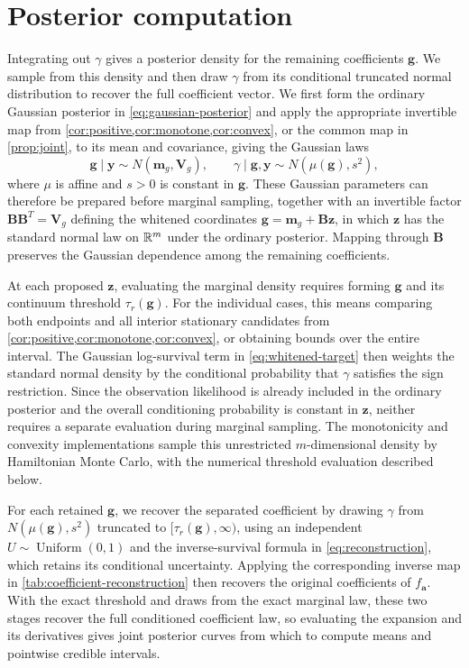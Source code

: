 \section{Posterior computation}\label{sec:computation}

Integrating out $\gamma$ gives a posterior density for the remaining
coefficients $\boldsymbol g$. We sample from this density and then draw
$\gamma$ from its conditional truncated normal distribution to recover
the full coefficient vector. We first form the ordinary
Gaussian posterior in \cref{eq:gaussian-posterior} and apply the
appropriate invertible map from
\cref{cor:positive,cor:monotone,cor:convex}, or the common map in
\cref{prop:joint}, to its mean and covariance,
giving the Gaussian laws
\[
 \boldsymbol g\mid\boldsymbol y\sim N(\boldsymbol m_g,\boldsymbol V_g),
 \qquad \gamma\mid\boldsymbol g,\boldsymbol y\sim N(\mu(\boldsymbol g),s^2),
\]
where $\mu$ is affine and $s>0$ is constant in $\boldsymbol g$.
These Gaussian parameters can therefore be prepared before marginal
sampling, together with an invertible factor
$\boldsymbol B\boldsymbol B^T=\boldsymbol V_g$ defining the whitened
coordinates $\boldsymbol g=\boldsymbol m_g+\boldsymbol B\boldsymbol z$,
in which $\boldsymbol z$ has the standard normal law on $\mathbb R^m$ under
the ordinary posterior. Mapping through $\boldsymbol B$ preserves the
Gaussian dependence among the remaining coefficients.

At each proposed $\boldsymbol z$, evaluating the marginal density
requires forming $\boldsymbol g$ and its continuum threshold
$\tau_r(\boldsymbol g)$. For the individual cases, this means comparing
both endpoints and all interior stationary candidates from
\cref{cor:positive,cor:monotone,cor:convex}, or obtaining bounds over
the entire interval. The Gaussian log-survival term in
\cref{eq:whitened-target} then weights the standard normal density by
the conditional probability that $\gamma$ satisfies the sign
restriction. Since the observation likelihood is already included
in the ordinary posterior and the overall conditioning probability
is constant in $\boldsymbol z$, neither requires a separate evaluation
during marginal sampling. The monotonicity and
convexity implementations sample this unrestricted $m$-dimensional
density by Hamiltonian Monte Carlo, with the numerical threshold
evaluation described below.

For each retained $\boldsymbol g$, we recover the separated coefficient
by drawing $\gamma$ from
$N(\mu(\boldsymbol g),s^2)$ truncated to
$[\tau_r(\boldsymbol g),\infty)$, using an independent
$U\sim\operatorname{Uniform}(0,1)$
and the inverse-survival formula in \cref{eq:reconstruction}, which
retains its conditional uncertainty. Applying the corresponding inverse
map in \cref{tab:coefficient-reconstruction} then recovers the original
coefficients of $f_{\boldsymbol a}$.
With the exact threshold and draws from the
exact marginal law, these two stages recover the full conditioned
coefficient law, so evaluating the expansion and its derivatives gives
joint posterior curves from which to compute means and pointwise
credible intervals.

